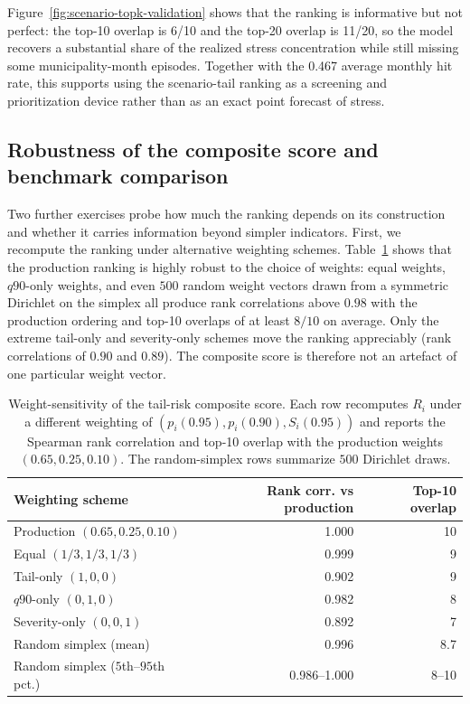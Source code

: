 \documentclass[11pt,a4paper]{article}
\begin{document}
Figure~\ref{fig:scenario-topk-validation} shows that the ranking is informative but not perfect: the top-10 overlap is 6/10 and the top-20 overlap is 11/20, so the model recovers a substantial share of the realized stress concentration while still missing some municipality-month episodes. Together with the 0.467 average monthly hit rate, this supports using the scenario-tail ranking as a screening and prioritization device rather than as an exact point forecast of stress.

\subsection{Robustness of the composite score and benchmark comparison}

Two further exercises probe how much the ranking depends on its construction and whether it carries information beyond simpler indicators. First, we recompute the ranking under alternative weighting schemes. Table~\ref{tab:weight-sensitivity} shows that the production ranking is highly robust to the choice of weights: equal weights, $q90$-only weights, and even $500$ random weight vectors drawn from a symmetric Dirichlet on the simplex all produce rank correlations above $0.98$ with the production ordering and top-10 overlaps of at least $8/10$ on average. Only the extreme tail-only and severity-only schemes move the ranking appreciably (rank correlations of $0.90$ and $0.89$). The composite score is therefore not an artefact of one particular weight vector.

\begin{table}[H]
\centering
\small
\caption{Weight-sensitivity of the tail-risk composite score. Each row recomputes $R_i$ under a different weighting of $(p_i(0.95), p_i(0.90), S_i(0.95))$ and reports the Spearman rank correlation and top-10 overlap with the production weights $(0.65, 0.25, 0.10)$. The random-simplex rows summarize $500$ Dirichlet draws.}
\label{tab:weight-sensitivity}
\begin{tabular}{lrr}
\toprule
Weighting scheme & Rank corr. vs production & Top-10 overlap \\
\midrule
Production $(0.65,0.25,0.10)$ & 1.000 & 10 \\
Equal $(1/3,1/3,1/3)$ & 0.999 & 9 \\
Tail-only $(1,0,0)$ & 0.902 & 9 \\
$q90$-only $(0,1,0)$ & 0.982 & 8 \\
Severity-only $(0,0,1)$ & 0.892 & 7 \\
Random simplex (mean) & 0.996 & 8.7 \\
Random simplex ($5$th--$95$th pct.) & 0.986--1.000 & 8--10 \\
\bottomrule
\end{tabular}
\end{table}
\end{document}
